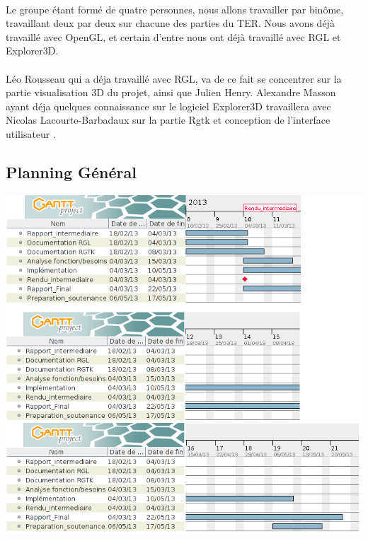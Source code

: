 \paragraph{} 
Le groupe étant formé de quatre personnes, nous allons travailler par binôme, travaillant deux par deux sur chacune des parties du TER. Nous avons déjà travaillé avec OpenGL, et certain d'entre nous ont déjà travaillé avec RGL et Explorer3D. 

\paragraph{} Léo Rousseau qui a déja travaillé avec RGL, va de ce fait se concentrer sur la partie visualisation 3D du projet, ainsi que Julien Henry. Alexandre Masson ayant déja quelques connaissance sur le logiciel Explorer3D travaillera avec Nicolas Lacourte-Barbadaux sur la partie Rgtk et conception de l'interface utilisateur .

\newpage
\subsection{Planning Général}

\begin{center}
\includegraphics[scale=0.7]{diag_ter.png}
\end{center}
\newpage